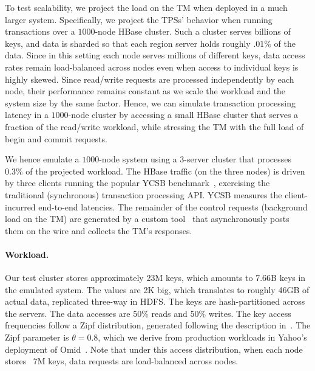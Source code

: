 To test scalability, we project the load on the TM when deployed in a much larger system. 
Specifically, we project the TPSs' behavior when running transactions over a $1000$-node HBase cluster.
Such a cluster serves billions of keys, and data is sharded so that each region server 
holds roughly $.01\%$ of the data.
Since in this setting each node serves millions of different keys, 
data access rates remain load-balanced across nodes 
even when access to individual keys is highly skewed. 
Since read/write requests are processed independently by each node, 
their performance remains constant as we scale the workload and the 
system size by the same factor. 
Hence, we can simulate transaction processing latency in 
a $1000$-node cluster
by accessing a small HBase cluster that serves a fraction of the read/write workload, 
while stressing the TM with the full load of begin and commit requests. 

We hence emulate a $1000$-node system using a $3$-server cluster that processes $0.3\%$ of the projected workload. 
The HBase traffic (on the three nodes) is driven by three clients running the popular YCSB benchmark~\cite{Cooper:2010:BCS:1807128.1807152}, 
exercising the traditional (synchronous) transaction processing API. YCSB measures the client-incurred end-to-end latencies.
The remainder of the control requests (background load on the TM) are generated by a custom tool~\cite{Omid2017} 
that asynchronously posts them on the wire and collects the TM's responses. 

\paragraph{Workload.}

Our test cluster stores approximately 23M keys, which amounts to 7.66B keys in the emulated system. 
The values are 2K big, which translates to roughly 46GB of actual data, replicated three-way in HDFS. The keys are hash-partitioned
across the servers. The data accesses are 50\% reads and 
50\% writes. The key access frequencies follow a Zipf distribution, generated following 
the description in~\cite{Gray:1994:QGB:191839.191886}. The Zipf parameter is $\theta=0.8$, which we derive from production 
workloads in Yahoo's deployment of Omid~\cite{Omid2017}. 
Note that under this access distribution, when each node stores ~7M keys, data requests are load-balanced across nodes.

